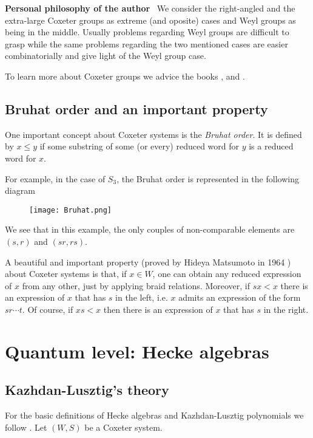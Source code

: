 \documentclass[12pt]{wart}
\theoremstyle{remark}
\begin{document}
\textbf{Personal philosophy of the author} \ We consider the right-angled and the extra-large Coxeter groups as extreme (and oposite) cases and Weyl groups as  being in the middle. Usually problems regarding Weyl groups are difficult to grasp while the same problems regarding the two mentioned cases are easier combinatorially and give light of the Weyl group case. 



To learn more about Coxeter groups we advice the books \cite{Hu}, \cite{BB} and \cite{Da}.


\subsection{Bruhat order and an important property}\label{imp}

One important concept  about Coxeter systems is the \emph{Bruhat order}. It is defined by $x\leq y$ if some substring of some (or every) reduced word for $y$ is a reduced word for $x$. 

For example, in the case of $S_3$, the Bruhat order is represented in the following diagram 
\begin{figure}[H] 
\begin{center}
 \texttt{[image: Bruhat.png]} 
\end{center}
\end{figure} 


We see that in this example, the only couples of non-comparable elements are $(s, r)$ and $(sr,rs)$.

A beautiful and important property (proved by  Hideya Matsumoto in 1964 \cite{Ma}) about Coxeter systems is that, if $x\in W$, one can obtain any reduced expression of $x$ from any other,  just by applying braid relations.  Moreover, if $sx<x$ there is an expression of $x$ that has $s$ in the left, i.e. $x$ admits an expression of the form $sr\cdots t$. Of course, if $xs<x$ then there is an expression of $x$ that has $s$ in the right. 

\section{Quantum level: Hecke algebras}
\subsection{Kazhdan-Lusztig's theory}

For the basic definitions of Hecke algebras and Kazhdan-Lusztig polynomials we follow \cite{SoKL}. Let $(W,S)$ be a Coxeter system. 
\end{document}
